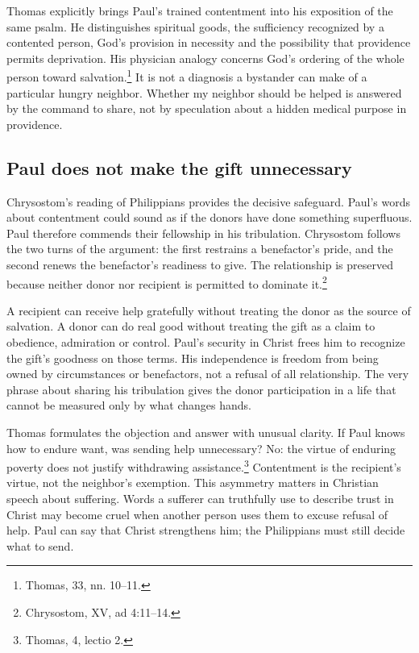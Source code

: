 Thomas explicitly brings Paul's trained contentment into his exposition of the same psalm. He distinguishes spiritual goods, the sufficiency recognized by a contented person, God's provision in necessity and the possibility that providence permits deprivation. His physician analogy concerns God's ordering of the whole person toward salvation.\footnote{Thomas,  33, nn. 10--11.} It is not a diagnosis a bystander can make of a particular hungry neighbor. Whether my neighbor should be helped is answered by the command to share, not by speculation about a hidden medical purpose in providence.

\subsection{Paul does not make the gift unnecessary}
Chrysostom's reading of Philippians provides the decisive safeguard. Paul's words about contentment could sound as if the donors have done something superfluous. Paul therefore commends their fellowship in his tribulation. Chrysostom follows the two turns of the argument: the first restrains a benefactor's pride, and the second renews the benefactor's readiness to give. The relationship is preserved because neither donor nor recipient is permitted to dominate it.\footnote{Chrysostom,  XV, ad 4:11--14.}

A recipient can receive help gratefully without treating the donor as the source of salvation. A donor can do real good without treating the gift as a claim to obedience, admiration or control. Paul's security in Christ frees him to recognize the gift's goodness on those terms. His independence is freedom from being owned by circumstances or benefactors, not a refusal of all relationship. The very phrase about sharing his tribulation gives the donor participation in a life that cannot be measured only by what changes hands.

Thomas formulates the objection and answer with unusual clarity. If Paul knows how to endure want, was sending help unnecessary? No: the virtue of enduring poverty does not justify withdrawing assistance.\footnote{Thomas,  4, lectio 2.} Contentment is the recipient's virtue, not the neighbor's exemption. This asymmetry matters in Christian speech about suffering. Words a sufferer can truthfully use to describe trust in Christ may become cruel when another person uses them to excuse refusal of help. Paul can say that Christ strengthens him; the Philippians must still decide what to send.

